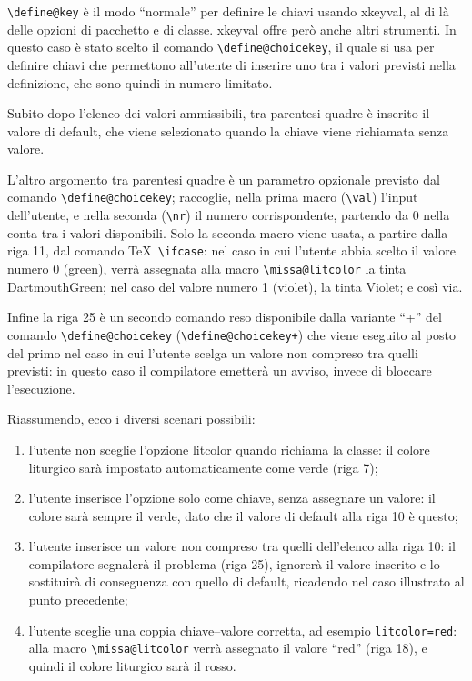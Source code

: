 \documentclass{scrartcl}
\begin{document}
\lstinline+\define@key+ è il modo ``normale'' per definire le chiavi usando xkeyval, al di là delle opzioni di pacchetto e di classe. xkeyval offre però anche altri strumenti. In questo caso è stato scelto il comando \lstinline+\define@choicekey+, il quale si usa per definire chiavi che permettono all'utente di inserire uno tra i valori previsti nella definizione, che sono quindi in numero limitato.

Subito dopo l'elenco dei valori ammissibili, tra parentesi quadre è inserito il valore di default, che viene selezionato quando la chiave viene richiamata senza valore.

L'altro argomento tra parentesi quadre è un parametro opzionale previsto dal comando \lstinline+\define@choicekey+; raccoglie, nella prima macro (\lstinline+\val+) l'input dell'utente, e nella seconda (\lstinline+\nr+) il numero corrispondente, partendo da 0 nella conta tra i valori disponibili. Solo la seconda macro viene usata, a partire dalla riga 11, dal comando \TeX\ \lstinline+\ifcase+: nel caso in cui l'utente abbia scelto il valore numero 0 (green), verrà assegnata alla macro \lstinline+\missa@litcolor+ la tinta DartmouthGreen; nel caso del valore numero 1 (violet), la tinta Violet; e così via.

Infine la riga 25 è un secondo comando reso disponibile dalla variante ``+'' del comando \lstinline+\define@choicekey+ (\lstinline|\define@choicekey+|) che viene eseguito al posto del primo nel caso in cui l'utente scelga un valore non compreso tra quelli previsti: in questo caso il compilatore emetterà un avviso, invece di bloccare l'esecuzione.

Riassumendo, ecco i diversi scenari possibili:
\begin{enumerate}
\item l'utente non sceglie l'opzione litcolor quando richiama la classe: il colore liturgico sarà impostato automaticamente come verde (riga 7);
\item l'utente inserisce l'opzione solo come chiave, senza assegnare un valore: il colore sarà sempre il verde, dato che il valore di default alla riga 10 è questo;
\item l'utente inserisce un valore non compreso tra quelli dell'elenco alla riga 10: il compilatore segnalerà il problema (riga 25), ignorerà il valore inserito e lo sostituirà di conseguenza con quello di default, ricadendo nel caso illustrato al punto precedente;
\item l'utente sceglie una coppia chiave--valore corretta, ad esempio \lstinline+litcolor=red+: alla macro \lstinline+\missa@litcolor+ verrà assegnato il valore ``red'' (riga 18), e quindi il colore liturgico sarà il rosso.
\end{enumerate}
\end{document}
